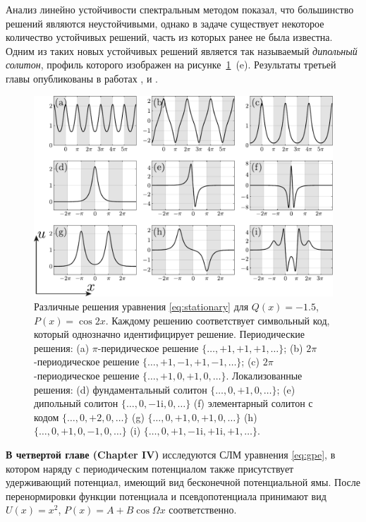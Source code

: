 \documentclass[candidate, href, colorlinks]{disser}
\begin{document}
Анализ линейно устойчивости спектральным методом показал, что большинство решений являются неустойчивыми, однако в задаче существует некоторое количество устойчивых решений, часть из которых ранее не была известна.
Одним из таких новых устойчивых решений является так называемый {\it дипольный солитон}, профиль которого изображен на рисунке~\ref{fig:solutions}~(e).
Результаты третьей главы опубликованы в работах \cite{LebedevAlfimovMalomed}, \cite{NizhniNovgorod2016} и \cite{Tashkent2018}.

\begin{figure}[h!]
\centering
	\includegraphics[scale = 1]{../pic/solutions for cosine equation}
	\caption{
		Различные решения уравнения \eqref{eq:stationary} для $Q(x) = -1.5$, $P(x) = \cos 2x$.
		Каждому решению соответствует символьный код, который однозначно идентифицирует решение.
		Периодические решения: (a) $\pi$-перидическое решение $\{ \dots, +1, +1, +1, \dots \}$; (b) $2 \pi$-периодическое решение $\{ \dots, +1, -1, +1, -1, \dots \}$; (c) $2 \pi$-периодическое решение $\{ \dots, +1, 0, +1, 0, \dots \}$.
		Локализованные решения: (d) фундаментальный солитон $\{ \dots, 0, +1, 0, \dots \}$; (e) дипольный солитон $\{ \dots, 0, -1\mathrm{i}, 0, \dots \}$ (f) элементарный солитон с кодом $\{ \dots, 0, +2, 0, \dots \}$ (g) $\{ \dots, 0, +1, 0, +1, 0, \dots \}$ (h) $\{ \dots, 0, +1, 0, -1, 0, \dots \}$ (i) $\{ \dots, 0, +1, -1\mathrm{i}, +1\mathrm{i}, +1, \dots \}$.
	}
\label{fig:solutions}
\end{figure}

\textbf{В четвертой главе (Chapter IV)} исследуются СЛМ уравнения \eqref{eq:gpe}, в котором наряду с периодическим потенциалом также присутствует удерживающий потенциал, имеющий вид бесконечной потенциальной ямы.
После перенормировки функции потенциала и псевдопотенциала принимают вид $U(x) = x^2$, $P(x) = A + B \cos \Omega x$ соответственно.
\end{document}
